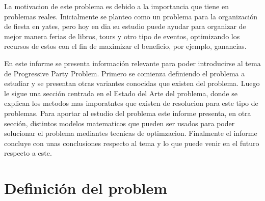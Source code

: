 \documentclass[spanish, fleqn]{article}
\begin{document}
La motivacion de este problema es debido a la importancia que tiene en problemas reales. Inicialmente se planteo como un problema para la organización de fiesta en yates, pero hoy en dia su estudio puede ayudar para organizar de mejor manera ferias de libros, tours y otro tipo de eventos, optimizando los recursos de estos con el fin de maximizar el beneficio, por ejemplo, ganancias.

En este informe se presenta información relevante para poder introducirse al tema de Progressive Party Problem. Primero se comienza definiendo el problema a estudiar y se presentan otras variantes conocidas que existen del problema. Luego le sigue una sección centrada en el Estado del Arte del problema, donde se explican los metodos mas imporatntes que existen de resolucion para este tipo de problemas. Para aportar al estudio del problema este informe presenta, en otra sección, distintos modelos matematicos que pueden ser usados para poder solucionar el problema mediantes tecnicas de optimzacion. Finalmente el informe concluye con unas conclusiones respecto al tema y lo que puede venir en el futuro respecto a este.

\section{Definición del problem}





\end{document}
